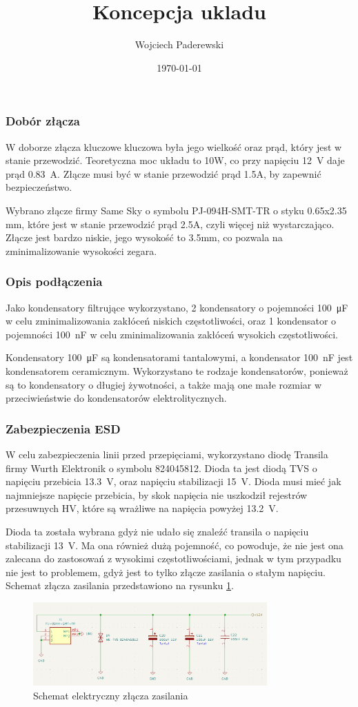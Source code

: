 \documentclass[../../main.tex]{subfiles}
\author{Wojciech Paderewski}
\date{\today}
\title{Koncepcja ukladu}
\begin{document}
\subsubsection{Dobór złącza}
W doborze złącza kluczowe kluczowa była jego wielkość oraz prąd, który jest w stanie przewodzić. Teoretyczna moc układu to 10W,
co przy napięciu \SI{12}{\volt} daje prąd \SI{0.83}{\ampere}. Złącze musi być w stanie przewodzić prąd 1.5A, by zapewnić bezpieczeństwo. 

Wybrano złącze firmy Same Sky o symbolu PJ-094H-SMT-TR o styku 0.65x2.35 mm, które jest w stanie przewodzić prąd 2.5A, czyli więcej niż wystarczająco.
Złącze jest bardzo niskie, jego wysokość to 3.5mm, co pozwala na zminimalizowanie wysokości zegara.
\subsubsection{Opis podłączenia}
Jako kondensatory filtrujące wykorzystano, 2 kondensatory o 
pojemności \SI{100}{\micro\farad}  w celu zminimalizowania zakłóceń niskich częstotliwości, oraz 1 kondensator o pojemności \SI{100}{\nano\farad} w celu zminimalizowania zakłóceń wysokich częstotliwości.

Kondensatory \SI{100}{\micro\farad}  są kondensatorami tantalowymi, a kondensator \SI{100}{\nano\farad} jest kondensatorem ceramicznym. Wykorzystano te rodzaje kondensatorów, 
ponieważ są to kondensatory o długiej żywotności, a także mają one małe rozmiar w przeciwieństwie do kondensatorów elektrolitycznych.
\subsubsection{Zabezpieczenia ESD}
W celu zabezpieczenia linii przed przepięciami, wykorzystano diodę Transila firmy Wurth Elektronik o symbolu 824045812. Dioda ta jest diodą TVS o napięciu przebicia \SI{13.3}{\volt},
oraz napięciu stabilizacji \SI{15}{\volt}. Dioda musi mieć jak najmniejsze napięcie przebicia, by skok napięcia nie uszkodził rejestrów przesuwnych HV, które są wrażliwe na napięcia powyżej \SI{13.2}{\volt}.

Dioda ta została wybrana gdyż nie udało się znaleźć transila o napięciu stabilizacji \SI{13}{\volt}. Ma ona również dużą pojemność, co powoduje, że nie jest ona zalecana do 
zastosowań z wysokimi częstotliwościami, jednak w tym przypadku nie jest to problemem, gdyż jest to tylko złącze zasilania o stałym napięciu. 
Schemat złącza zasilania przedstawiono na rysunku \ref{fig:DcPlug_schemat}.
\begin{figure}[H]
    \centering
    \includegraphics[width=0.8\textwidth]{dc_plug_schemat.png}
    \caption{Schemat elektryczny złącza zasilania}
    \label{fig:DcPlug_schemat}
\end{figure}
\end{document}
